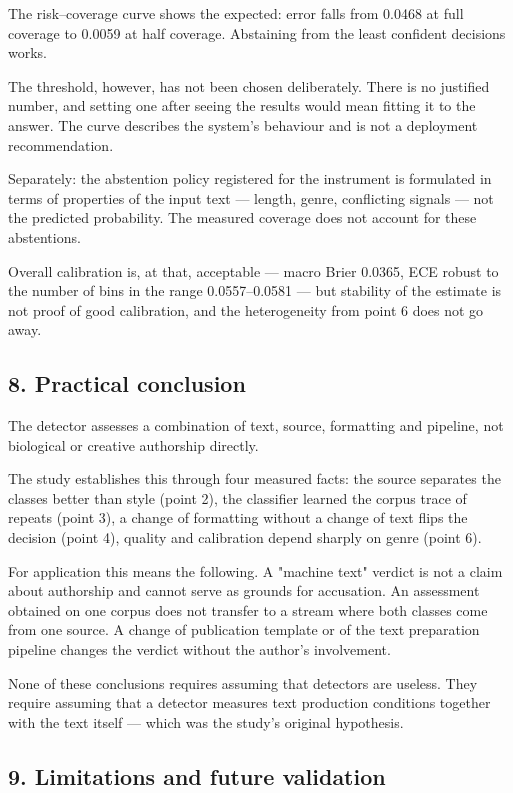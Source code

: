 \documentclass[11pt,a4paper]{article}
\renewcommand{\_}{\textunderscore\allowbreak}
\begin{document}
The risk–coverage curve shows the expected: error falls from 0.0468 at full
coverage to 0.0059 at half coverage. Abstaining from the least confident
decisions works.

The threshold, however, has not been chosen deliberately. There is no justified
number, and setting one after seeing the results would mean fitting it to the
answer. The curve describes the system's behaviour and is not a deployment
recommendation.

Separately: the abstention policy registered for the instrument is formulated in
terms of properties of the input text — length, genre, conflicting signals — not
the predicted probability. The measured coverage does not account for these
abstentions.

Overall calibration is, at that, acceptable — macro Brier 0.0365, ECE robust to
the number of bins in the range 0.0557–0.0581 — but stability of the estimate is
not proof of good calibration, and the heterogeneity from point 6 does not go
away.

\subsection{8. Practical conclusion}

The detector assesses a combination of text, source, formatting and pipeline, not
biological or creative authorship directly.

The study establishes this through four measured facts: the source separates the
classes better than style (point 2), the classifier learned the corpus trace of
repeats (point 3), a change of formatting without a change of text flips the
decision (point 4), quality and calibration depend sharply on genre (point 6).

For application this means the following. A "machine text" verdict is not a claim
about authorship and cannot serve as grounds for accusation. An assessment
obtained on one corpus does not transfer to a stream where both classes come from
one source. A change of publication template or of the text preparation pipeline
changes the verdict without the author's involvement.

None of these conclusions requires assuming that detectors are useless. They
require assuming that a detector measures text production conditions together
with the text itself — which was the study's original hypothesis.

\subsection{9. Limitations and future validation}
\end{document}
